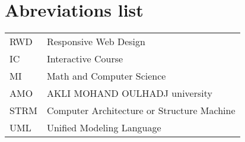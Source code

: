 \chapter*{Abreviations list}
\lhead{}

\begin{tabular}{ll}
RWD & Responsive Web Design \\
IC  & Interactive Course \\
MI  & Math and Computer Science \\
AMO & AKLI MOHAND OULHADJ university \\
STRM & Computer Architecture or Structure Machine\\
UML & Unified Modeling Language \\
\end{tabular}